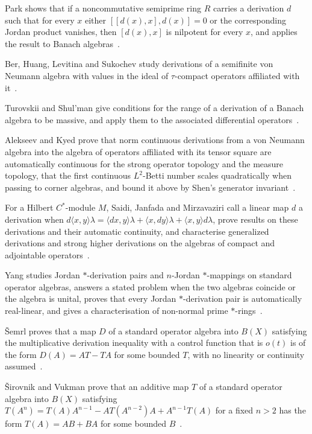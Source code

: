 Park shows that if a noncommutative semiprime ring $R$ carries a derivation $d$ such that for every $x$ either $[[d(x),x],d(x)]=0$ or the corresponding Jordan product vanishes, then $[d(x),x]$ is nilpotent for every $x$, and applies the result to Banach algebras~\cite{WlOnDerivationsInNoncommutativeS2005}.

Ber, Huang, Levitina and Sukochev study derivations of a semifinite von Neumann algebra with values in the ideal of $\tau$-compact operators affiliated with it~\cite{WlDerivationsWithValuesInTheIdea2022}.

Turovskii and Shul'man give conditions for the range of a derivation of a Banach algebra to be massive, and apply them to the associated differential operators~\cite{WlConditionsForMassivenessOfTheR1993}.

Alekseev and Kyed prove that norm continuous derivations from a von Neumann algebra into the algebra of operators affiliated with its tensor square are automatically continuous for the strong operator topology and the measure topology, that the first continuous $L^2$-Betti number scales quadratically when passing to corner algebras, and bound it above by Shen's generator invariant~\cite{WlMeasureContinuousDerivationsOn2013}.

For a Hilbert $C^*$-module $M$, Saidi, Janfada and Mirzavaziri call a linear map $d$ a derivation when $d\langle x,y\rangle\lambda=\langle dx,y\rangle\lambda+\langle x,dy\rangle\lambda+\langle x,y\rangle d\lambda$, prove results on these derivations and their automatic continuity, and characterise generalized derivations and strong higher derivations on the algebras of compact and adjointable operators~\cite{WlKindsOfDerivationsOnHilbertCSt2015}.

Yang studies Jordan $*$-derivation pairs and $n$-Jordan $*$-mappings on standard operator algebras, answers a stated problem when the two algebras coincide or the algebra is unital, proves that every Jordan $*$-derivation pair is automatically real-linear, and gives a characterisation of non-normal prime $*$-rings~\cite{WlJordanDerivationPairsOnStandar2005}.

\v{S}emrl proves that a map $D$ of a standard operator algebra into $B(X)$ satisfying the multiplicative derivation inequality with a control function that is $o(t)$ is of the form $D(A)=AT-TA$ for some bounded $T$, with no linearity or continuity assumed~\cite{WlTheFunctionalEquationOfMultipl1994}.

\v{S}irovnik and Vukman prove that an additive map $T$ of a standard operator algebra into $B(X)$ satisfying $T(A^n)=T(A)A^{n-1}-AT(A^{n-2})A+A^{n-1}T(A)$ for a fixed $n>2$ has the form $T(A)=AB+BA$ for some bounded $B$~\cite{WlOnCertainFunctionalEquationRel2014}.

